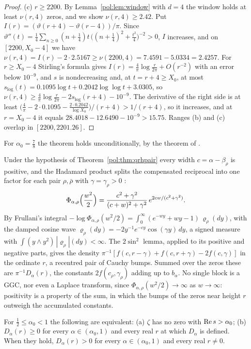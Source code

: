 \begin{proof}
(c) $r\ge2200$. By Lemma~\ref{pol:lem:window} with $d=4$ the window holds at least $\nu(r,4)$ zeros, and we show $\nu(r,4)\ge2.42$. Put $I(r)=(\vartheta(r+4)-\vartheta(r-4))/\pi$. Since $\vartheta''(t)=\frac14\sum_{n\ge0}(n+\frac14)t\,\big((n+\frac14)^2+\frac{t^2}4\big)^{-2}>0$, $I$ increases, and on $[2200,X_0-4]$ we have $\nu(r,4)=I(r)-2\cdot2.5167\ge\nu(2200,4)=7.4591-5.0334=2.4257$. For $r\ge X_0-4$ Stirling's formula gives $I(r)=\frac4\pi\log\frac r{2\pi}+O(r^{-2})$ with an error below $10^{-9}$, and $s$ is nondecreasing and, at $t=r+4\ge X_0$, at most $s_{\log}(t)=0.1095\log t+0.2042\log\log t+3.0305$, so $\nu(r,4)\ge\frac4\pi\log\frac r{2\pi}-2s_{\log}(r+4)-10^{-9}$. The derivative of the right side is at least $\big(\frac4\pi-2\cdot0.1095-\frac{2\cdot0.2042}{\log X_0}\big)/(r+4)>1/(r+4)$, so it increases, and at $r=X_0-4$ it equals $28.4018-12.6490-10^{-9}>15.75$. Ranges (b) and (c) overlap in $[2200,2201.26]$.
\end{proof}

For $\alpha_0=\frac78$ the theorem holds unconditionally, by the theorem of \cite{OAI26a}.

\begin{remark}\label{pol:rem:blocks}
Under the hypothesis of Theorem~\ref{pol:thm:qrhpair} every width $c=\alpha-\beta_\rho$ is positive, and the Hadamard product splits the compensated reciprocal into one factor for each pair $\rho,\bar\rho$ with $\gamma=\gamma_\rho>0$ \cite{PolsonRXi26}:
\[
\Phi_{\alpha,\rho}\Bigl(\frac{w^2}2\Bigr)=\frac{c^2+\gamma^2}{(c+w)^2+\gamma^2}\,e^{2cw/(c^2+\gamma^2)} .
\]
By Frullani's integral $-\log\Phi_{\alpha,\rho}(w^2/2)=\int_0^\infty(e^{-wy}+wy-1)\,\varrho_\rho(dy)$, with the damped cosine wave $\varrho_\rho(dy)=-2y^{-1}e^{-cy}\cos(\gamma y)\,dy$, a signed measure with $\int(y\wedge y^2)\,|\varrho_\rho|(dy)<\infty$. The $2\sin^2$ lemma, applied to its positive and negative parts, gives the density $\pi^{-1}[f(c,r-\gamma)+f(c,r+\gamma)-2f(c,\gamma)]$ in the ordinate $r$, a recentred pair of Cauchy bumps. Summed over the zeros these are $\pi^{-1}D_\alpha(r)$, the constants $2f(c_\rho,\gamma_\rho)$ adding up to $b_\alpha$. No single block is a GGC, nor even a Laplace transform, since $\Phi_{\alpha,\rho}(w^2/2)\to\infty$ as $w\to\infty$: positivity is a property of the sum, in which the bumps of the zeros near height $r$ outweigh the accumulated constants.
\end{remark}

\begin{corollary}\label{pol:cor:equiv}
For $\frac12\le\alpha_0<1$ the following are equivalent: (a) $\zeta$ has no zero with $\operatorname{Re} s>\alpha_0$; (b) $D_\alpha(r)\ge0$ for every $\alpha\in(\alpha_0,1)$ and every real $r$ at which $D_\alpha$ is defined. When they hold, $D_\alpha(r)>0$ for every $\alpha\in(\alpha_0,1)$ and every real $r\ne0$.
\end{corollary}

